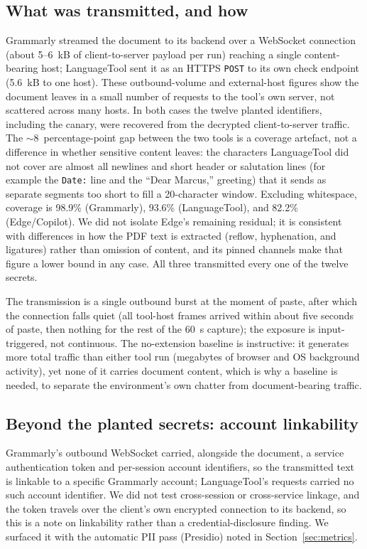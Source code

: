 \documentclass[sigconf,anonymous,review,balance=false]{acmart}
\begin{document}
\subsection{What was transmitted, and how}

Grammarly streamed the document to its backend over a WebSocket connection (about 5--6~kB of
client-to-server payload per run) reaching a single content-bearing host; LanguageTool sent
it as an HTTPS \texttt{POST} to its own check endpoint (5.6~kB to one host). These
outbound-volume and external-host figures show the document leaves in a small number of
requests to the tool's own server, not scattered across many hosts. In both cases the twelve
planted identifiers,
including the canary, were recovered from the decrypted client-to-server traffic. The
$\sim$8~percentage-point gap between the two tools is a coverage artefact, not a difference
in whether sensitive content leaves: the characters LanguageTool did not cover are almost
all newlines and short header or salutation lines (for example the \texttt{Date:} line and
the ``Dear Marcus,'' greeting) that it sends as separate segments too short to fill a
20-character window. Excluding whitespace, coverage is 98.9\% (Grammarly), 93.6\%
(LanguageTool), and 82.2\% (Edge/Copilot). We did not isolate Edge's remaining residual; it
is consistent with differences in how the PDF text is extracted (reflow, hyphenation, and
ligatures) rather than omission of content, and its pinned channels make that figure a lower
bound in any case. All three transmitted every one of the twelve secrets.

The transmission is a single outbound burst at the moment of paste, after which the
connection falls quiet (all tool-host frames arrived within about five seconds of paste,
then nothing for the rest of the 60~s capture); the exposure is input-triggered, not
continuous. The no-extension baseline is instructive: it generates more total traffic than
either tool run (megabytes of browser and OS background activity), yet none of it carries
document content, which is why a baseline is needed, to separate the environment's own
chatter from document-bearing traffic.

\subsection{Beyond the planted secrets: account linkability}
\label{sec:linkability}

Grammarly's outbound WebSocket carried, alongside the document, a service authentication
token and per-session account identifiers, so the transmitted text is linkable to a
specific Grammarly account; LanguageTool's requests carried no such account identifier. We
did not test cross-session or cross-service linkage, and the token travels over the
client's own encrypted connection to its backend, so this is a note on linkability rather
than a credential-disclosure finding. We surfaced it with the automatic PII pass (Presidio)
noted in Section~\ref{sec:metrics}.
\end{document}

